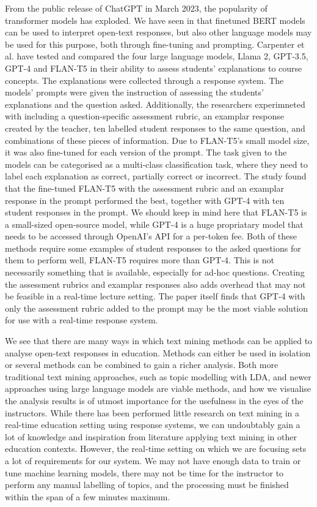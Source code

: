 From the public release of ChatGPT in March 2023, the popularity of transformer models has exploded. We have seen in \cite{setsum2022} that finetuned BERT models can be used to interpret open-text responses, but also other language models may be used for this purpose, both through fine-tuning and prompting. Carpenter et al. \cite{carpenter2024} have tested and compared the four large language models, Llama 2, GPT-3.5, GPT-4 and FLAN-T5 in their ability to assess students' explanations to course concepts. The explanations were collected through a response system. The models' prompts were given the instruction of assessing the students' explanations and the question asked. Additionally, the researchers experimneted with including a question-specific assessment rubric, an examplar response created by the teacher, ten labelled student responses to the same question, and combinations of these pieces of information. Due to FLAN-T5's small model size, it was also fine-tuned for each version of the prompt. The task given to the models can be categorised as a multi-class classification task, where they need to label each explanation as correct, partially correct or incorrect. The study found that the fine-tuned FLAN-T5 with the assessment rubric and an examplar response in the prompt performed the best, together with GPT-4 with ten student responses in the prompt. We should keep in mind here that FLAN-T5 is a small-sized open-source model, while GPT-4 is a huge propriatary model that needs to be accessed through OpenAI's API for a per-token fee. Both of these methods require some examples of student responses to the asked questions for them to perform well, FLAN-T5 requires more than GPT-4. This is not necessarily something that is available, especially for ad-hoc questions. Creating the assessment rubrics and examplar responses also adds overhead that may not be feasible in a real-time lecture setting. The paper itself finds that GPT-4 with only the assessment rubric added to the prompt may be the most viable solution for use with a real-time response system.

We see that there are many ways in which text mining methods can be applied to analyse open-text responses in education. Methods can either be used in isolation or several methods can be combined to gain a richer analysis. Both more traditional text mining approaches, such as topic modelling with LDA, and newer approaches using large language models are viable methods, and how we visualise the analysis results is of utmost importance for the usefulness in the eyes of the instructors. While there has been performed little research on text mining in a real-time education setting using response systems, we can undoubtably gain a lot of knowledge and inspiration from literature applying text mining in other education contexts. However, the real-time setting on which we are focusing sets a lot of requirements for our system. We may not have enough data to train or tune machine learning models, there may not be time for the instructor to perform any manual labelling of topics, and the processing must be finished within the span of a few minutes maximum.



